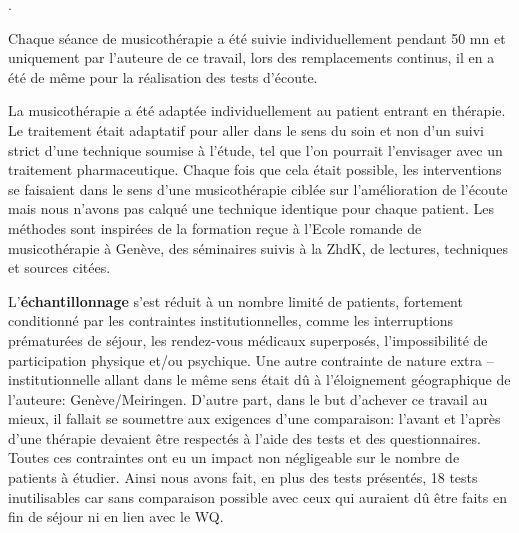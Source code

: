  
 
 
 
 .%


 Chaque séance de musicothérapie a été suivie individuellement pendant 50 mn et uniquement par 
 l'auteure de ce 
 travail, lors des remplacements continus, il en a été de même pour la réalisation des tests d'écoute.
 
   La musicothérapie a été adaptée individuellement au patient entrant en thérapie. Le traitement était 
   adaptatif pour aller dans le sens du soin et non d'un suivi strict d'une technique soumise à l'étude, tel 
   que l'on pourrait 
   l'envisager avec un traitement  pharmaceutique.
 Chaque fois que  cela était possible, les interventions se faisaient dans le sens d'une musicothérapie 
 ciblée sur l'amélioration de l'écoute mais nous n'avons pas calqué une technique identique pour chaque 
 patient.
  Les méthodes sont inspirées de la formation reçue à l'Ecole 
 romande de 
 musicothérapie à Genève, des séminaires suivis à la ZhdK, de lectures, techniques  et sources citées. 
 
 
 L'\textbf{échantillonnage} s'est réduit à un nombre limité de
 patients, fortement conditionné par les contraintes
 institutionnelles, comme les interruptions prématurées de séjour, les rendez-vous
 médicaux superposés, l'impossibilité de participation physique et/ou
 psychique.
 Une autre contrainte de nature extra -- institutionnelle allant dans le
 même sens était dû à l'éloignement géographique de l'auteure: Genève/Meiringen.
 D'autre part, dans le but d'achever ce travail au mieux, il fallait se soumettre aux exigences d'une 
 comparaison:  l'avant et l'après d'une thérapie devaient être respectés à l'aide des tests et des 
 questionnaires.
 Toutes ces contraintes ont  eu un impact non négligeable 
 sur le nombre de patients à étudier. 
 Ainsi nous avons fait, en plus des tests présentés, 18  tests  
 inutilisables car sans comparaison possible avec ceux qui auraient dû être faits en fin de séjour ni en lien 
 avec le WQ.
 

